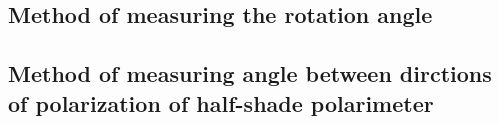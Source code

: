 \subsection{Method of measuring the rotation angle}

\subsection{Method of measuring angle between dirctions of polarization of half-shade polarimeter}
